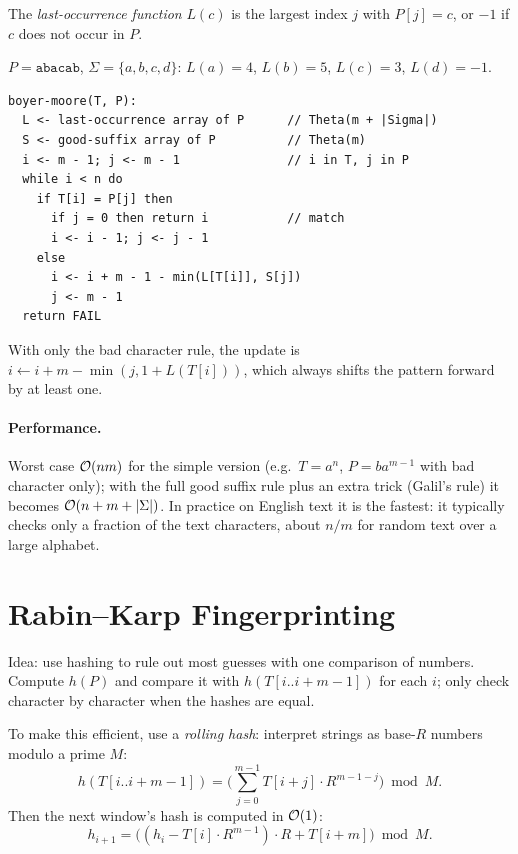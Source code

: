 \begin{definition}
The \emph{last-occurrence function} $L(c)$ is the largest index $j$ with
$P[j] = c$, or $-1$ if $c$ does not occur in $P$.
\end{definition}

\begin{example}
$P = \texttt{abacab}$, $\Sigma = \{a,b,c,d\}$: $L(a) = 4$, $L(b) = 5$, $L(c) = 3$,
$L(d) = -1$.
\end{example}

\begin{lstlisting}
boyer-moore(T, P):
  L <- last-occurrence array of P      // Theta(m + |Sigma|)
  S <- good-suffix array of P          // Theta(m)
  i <- m - 1; j <- m - 1               // i in T, j in P
  while i < n do
    if T[i] = P[j] then
      if j = 0 then return i           // match
      i <- i - 1; j <- j - 1
    else
      i <- i + m - 1 - min(L[T[i]], S[j])
      j <- m - 1
  return FAIL
\end{lstlisting}
With only the bad character rule, the update is
$i \leftarrow i + m - \min(j, 1 + L(T[i]))$, which always shifts the pattern
forward by at least one.

\paragraph{Performance.} Worst case $\mathcal{O}(nm)$ for the simple version (e.g.\
$T = a^n$, $P = ba^{m-1}$ with bad character only); with the full good suffix
rule plus an extra trick (Galil's rule) it becomes $\mathcal{O}(n + m + |\Sigma|)$. In practice on English text it is the fastest: it typically checks
only a fraction of the text characters, about $n/m$ for random text over a large
alphabet.

\section{Rabin--Karp Fingerprinting}

Idea: use hashing to rule out most guesses with one comparison of numbers.
Compute $h(P)$ and compare it with $h(T[i..i+m-1])$ for each $i$; only check
character by character when the hashes are equal.

To make this efficient, use a \emph{rolling hash}: interpret strings as base-$R$
numbers modulo a prime $M$:
\[
h(T[i..i+m-1]) = \Big(\sum_{j=0}^{m-1} T[i+j] \cdot R^{m-1-j}\Big) \bmod M.
\]
Then the next window's hash is computed in $\mathcal{O}(1)$:
\[
h_{i+1} = \big((h_i - T[i] \cdot R^{m-1}) \cdot R + T[i+m]\big) \bmod M.
\]

